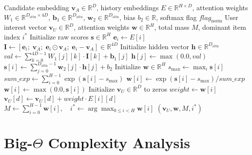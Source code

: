 \documentclass[11pt,a4paper]{article}
\theoremstyle{definition}
\begin{document}
\begin{algorithm}[H]
\caption{Deep Interest Network (DIN) Target-Dependent Attention Forward Pass}
\begin{algorithmic}[1]
\Require Candidate embedding $\mathbf{v}_A \in \mathbb{R}^D$, history embeddings $E \in \mathbb{R}^{H \times D}$, attention weights $W_1 \in \mathbb{R}^{D_{\text{attn}} \times 4D}$, $\mathbf{b}_1 \in \mathbb{R}^{D_{\text{attn}}}$, $\mathbf{w}_2 \in \mathbb{R}^{D_{\text{attn}}}$, bias $b_2 \in \mathbb{R}$, softmax flag $flag_{\text{norm}}$
\Ensure User interest vector $\mathbf{v}_U \in \mathbb{R}^D$, attention weights $\mathbf{w} \in \mathbb{R}^H$, total mass $M$, dominant item index $i^*$
\State Initialize raw scores $\mathbf{s} \in \mathbb{R}^H$
 
    \State $\mathbf{e}_i \gets E[i]$
    \State $\mathbf{I} \gets [\mathbf{e}_i; \; \mathbf{v}_A; \; \mathbf{e}_i \odot \mathbf{v}_A; \; \mathbf{e}_i - \mathbf{v}_A] \in \mathbb{R}^{4D}$
    \State Initialize hidden vector $\mathbf{h} \in \mathbb{R}^{D_{\text{attn}}}$
        \State $val \gets \sum_{k=0}^{4D-1} W_1[j][k] \cdot \mathbf{I}[k] + \mathbf{b}_1[j]$
        \State $\mathbf{h}[j] \gets \max(0.0, val)$
    \EndFor
    \State $\mathbf{s}[i] \gets \sum_{j=0}^{D_{\text{attn}}-1} \mathbf{w}_2[j] \cdot \mathbf{h}[j] + b_2$
\EndFor
\State Initialize $\mathbf{w} \in \mathbb{R}^H$
 
    \State $s_{\max} \gets \max_i \mathbf{s}[i]$
    \State $sum\_exp \gets \sum_{i=0}^{H-1} \exp(\mathbf{s}[i] - s_{\max})$
        \State $\mathbf{w}[i] \gets \exp(\mathbf{s}[i] - s_{\max}) / sum\_exp$
    \EndFor
\Else {}
        \State $\mathbf{w}[i] \gets \max(0.0, \mathbf{s}[i])$
    \EndFor
\EndIf
\State Initialize $\mathbf{v}_U \in \mathbb{R}^D$ to zeros
 
    \State $weight \gets \mathbf{w}[i]$
        \State $\mathbf{v}_U[d] \gets \mathbf{v}_U[d] + weight \cdot E[i][d]$
    \EndFor
\EndFor
\State $M \gets \sum_{i=0}^{H-1} \mathbf{w}[i], \quad i^* \gets \arg\max_{0 \le i < H} \mathbf{w}[i]$
\State \Return $(\mathbf{v}_U, \mathbf{w}, M, i^*)$
\end{algorithmic}
\end{algorithm}

\section{Big-$\Theta$ Complexity Analysis}
\end{document}
